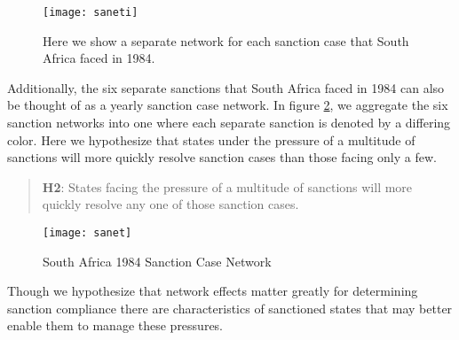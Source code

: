 \begin{figure}[ht]
	\centering
	\texttt{[image: saneti]}
	\caption{Here we show a separate network for each sanction case that South Africa faced in 1984.}
	\label{fig:saneti}
\end{figure}
\FloatBarrier

Additionally, the six separate sanctions that South Africa faced in 1984 can also be thought of as a yearly sanction case network. In figure \ref{fig:sanet}, we aggregate the six sanction networks into one where each separate sanction is denoted by a differing color. Here we hypothesize that states under the pressure of a multitude of sanctions will more quickly resolve sanction cases than those facing only a few.

\begin{quote}
	\textbf{H2}: States facing the pressure of a multitude of sanctions will more quickly resolve any one of those sanction cases.
\end{quote}

\begin{figure}[ht]
	\centering
	\texttt{[image: sanet]}
	\caption{South Africa 1984 Sanction Case Network}
	\label{fig:sanet}
\end{figure}
\FloatBarrier



Though we hypothesize that network effects matter greatly for determining sanction compliance there are characteristics of sanctioned states that may better enable them to manage these pressures. 

